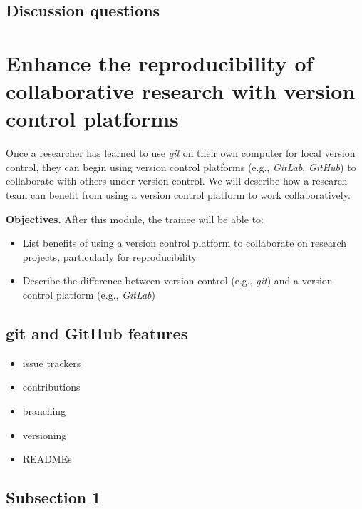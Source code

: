 \documentclass[]{tufte-book}
\providecommand{\tightlist}{%
  \setlength{\itemsep}{0pt}\setlength{\parskip}{0pt}}
\begin{document}
\hypertarget{discussion-questions}{%
\subsection{Discussion questions}\label{discussion-questions}}

\hypertarget{enhance-the-reproducibility-of-collaborative-research-with-version-control-platforms}{%
\section{Enhance the reproducibility of collaborative research with version control platforms}\label{enhance-the-reproducibility-of-collaborative-research-with-version-control-platforms}}

Once a researcher has learned to use \emph{git} on their own computer for
local version control, they can begin using version control platforms (e.g.,
\emph{GitLab}, \emph{GitHub}) to collaborate with others under version
control. We will describe how a research team can benefit from using a version
control platform to work collaboratively.

\textbf{Objectives.} After this module, the trainee will be able to:

\begin{itemize}
\tightlist
\item
  List benefits of using a version control platform to collaborate
  on research projects, particularly for reproducibility
\item
  Describe the difference between version control (e.g., \emph{git}) and
  a version control platform (e.g., \emph{GitLab})
\end{itemize}

\hypertarget{git-and-github-features}{%
\subsection{git and GitHub features}\label{git-and-github-features}}

\begin{itemize}
\tightlist
\item
  issue trackers
\item
  contributions
\item
  branching
\item
  versioning
\item
  READMEs
\end{itemize}

\hypertarget{subsection-1}{%
\subsection{Subsection 1}\label{subsection-1}}
\end{document}

